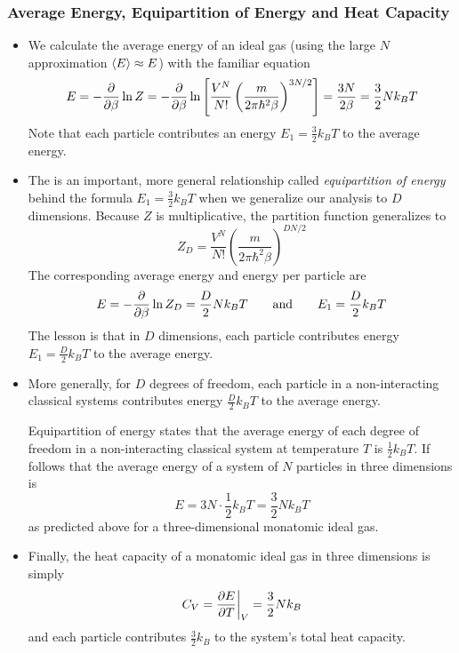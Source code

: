 \documentclass[11pt, a4paper]{article}
\begin{document}
\subsubsection{Average Energy, Equipartition of Energy and Heat Capacity}
\begin{itemize}
	\item We calculate the average energy of an ideal gas (using the large $ N $ approximation $ \expval{E} \approx E $) with the familiar equation
	\begin{equation*}
		E = - \pdv{}{\beta} \ln Z = - \pdv{}{\beta}  \ln\left [\frac{V^{N}}{N!} \left(\frac{m}{2\pi \hbar^{2} \beta}\right)^{3N/2}\right ] = \frac{3N}{2\beta} = \frac{3}{2}Nk_{B}T
	\end{equation*}
	Note that each particle contributes an energy $ E_{1} = \frac{3}{2}k_{B}T $ to the average energy.
	
	\item The is an important, more general relationship called \textit{equipartition of energy} behind the formula $ E_{1} = \frac{3}{2}k_{B}T $ when we generalize our analysis to $ D $ dimensions. Because $ Z $ is multiplicative, the partition function generalizes to
	\begin{equation*}
		Z_{D} = \frac{V^{N}}{N!} \left(\frac{m}{2\pi \hbar^{2} \beta}\right)^{DN/2}
	\end{equation*}
	The corresponding average energy and energy per particle are
	\begin{equation*}
		E = - \pdv{}{\beta} \ln Z_{D} = \frac{D}{2}Nk_{B}T \qquad \text{and} \qquad E_{1} = \frac{D}{2}k_{B}T
	\end{equation*}
	The lesson is that in $ D $ dimensions, each particle contributes energy $ E_{1} = \frac{D}{2}k_{B}T $ to the average energy.
	
	\item More generally, for $ D $ degrees of freedom, each particle in a non-interacting classical systems contributes energy $ \frac{D}{2}k_{B}T $ to the average energy. 
	
	Equipartition of energy states that the average energy of each degree of freedom in a non-interacting classical system at temperature $ T $ is $ \frac{1}{2} k_{B}T $. If follows that the average energy of a system of $ N $ particles in three dimensions is 
	\begin{equation*}
		E = 3N \cdot \frac{1}{2} k_{B}T = \frac{3}{2}Nk_{B}T
	\end{equation*}
	as predicted above for a three-dimensional monatomic ideal gas.
	
	\item Finally, the heat capacity of a monatomic ideal gas in three dimensions is simply
	\begin{equation*}
		C_{V} = \pdv{E}{T}\bigg|_{V} = \frac{3}{2}N k_{B}
	\end{equation*}
	and each particle contributes $ \frac{3}{2} k_{B} $ to the system's total heat capacity.
\end{itemize}
\end{document}
